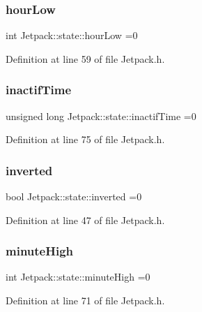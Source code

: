 \subsubsection{\texorpdfstring{hour\+Low}{hourLow}}
{\footnotesize\ttfamily int Jetpack\+::state\+::hour\+Low =0}



Definition at line 59 of file Jetpack.\+h.

\mbox{\label{struct_jetpack_1_1state_aaf817b1f9e7a4d65b9e3ca4726b281f6}} 
\subsubsection{\texorpdfstring{inactif\+Time}{inactifTime}}
{\footnotesize\ttfamily unsigned long Jetpack\+::state\+::inactif\+Time =0}



Definition at line 75 of file Jetpack.\+h.

\mbox{\label{struct_jetpack_1_1state_a6bc03bb8f05b10aa142dbb0c39c87fb5}} 
\subsubsection{\texorpdfstring{inverted}{inverted}}
{\footnotesize\ttfamily bool Jetpack\+::state\+::inverted =0}



Definition at line 47 of file Jetpack.\+h.

\mbox{\label{struct_jetpack_1_1state_a8c26c18b0ec449b7545934cb01cca028}} 
\subsubsection{\texorpdfstring{minute\+High}{minuteHigh}}
{\footnotesize\ttfamily int Jetpack\+::state\+::minute\+High =0}



Definition at line 71 of file Jetpack.\+h.

